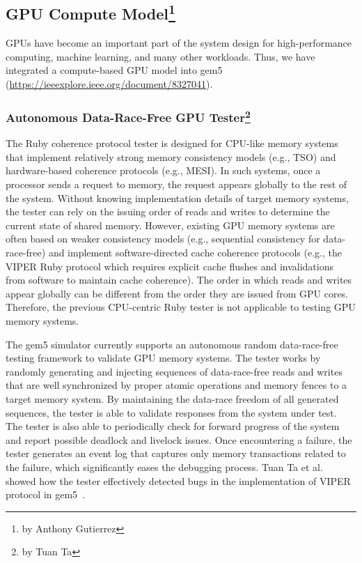 \subsection[GPU Compute Model]{GPU Compute Model\footnote{by Anthony Gutierrez}}
\label{sec:gpu}

GPUs have become an important part of the system design for high-performance computing, machine learning, and many other workloads.
Thus, we have integrated a compute-based GPU model into gem5~\cite{gutierrez-hpca-gpu} (\url{https://ieeexplore.ieee.org/document/8327041}).

\subsubsection[Autonomous Data-Race-Free GPU Tester]{Autonomous Data-Race-Free GPU Tester\footnote{by Tuan Ta}}

The Ruby coherence protocol tester is designed for CPU-like memory systems that implement relatively strong memory consistency models (e.g., TSO) and hardware-based coherence protocols (e.g., MESI).
In such systems, once a processor sends a request to memory, the request appears globally to the rest of the system.
Without knowing implementation details of target memory systems, the tester can rely on the issuing order of reads and writes to determine the current state of shared memory.
However, existing GPU memory systems are often based on weaker consistency models (e.g., sequential consistency for data-race-free) and implement software-directed cache coherence protocols (e.g., the VIPER Ruby protocol which requires explicit cache flushes and invalidations from software to maintain cache coherence).
The order in which reads and writes appear globally can be different from the order they are issued from GPU cores.
Therefore, the previous CPU-centric Ruby tester is not applicable to testing GPU memory systems.

The gem5 simulator currently supports an autonomous random data-race-free testing framework to validate GPU memory systems.
The tester works by randomly generating and injecting sequences of data-race-free reads and writes that are well synchronized by proper atomic operations and memory fences to a target memory system.
By maintaining the data-race freedom of all generated sequences, the tester is able to validate responses from the system under test.
The tester is also able to periodically check for forward progress of the system and report possible deadlock and livelock issues.
Once encountering a failure, the tester generates an event log that captures only memory transactions related to the failure, which significantly eases the debugging process.
Tuan Ta et al. showed how the tester effectively detected bugs in the implementation of VIPER protocol in gem5~\cite{Ta2019gputesting}.

